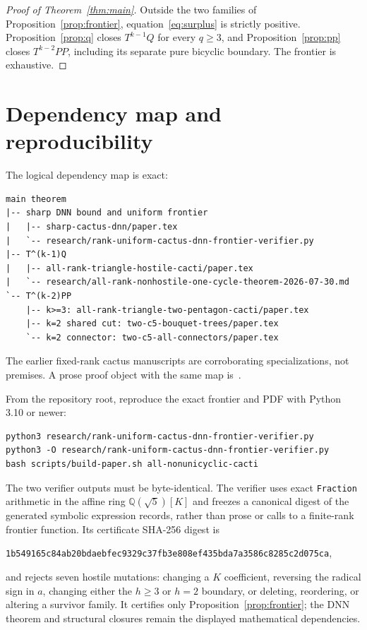 \documentclass[11pt]{article}
\begin{document}
\begin{proof}[Proof of Theorem~\ref{thm:main}]
Outside the two families of Proposition~\ref{prop:frontier},
equation~\eqref{eq:surplus} is strictly positive.  Proposition~\ref{prop:q}
closes $T^{k-1}Q$ for every $q\geq3$, and Proposition~\ref{prop:pp} closes
$T^{k-2}PP$, including its separate pure bicyclic boundary.  The frontier is
exhaustive.
\end{proof}

\section{Dependency map and reproducibility}

The logical dependency map is exact:
\begin{verbatim}
main theorem
|-- sharp DNN bound and uniform frontier
|   |-- sharp-cactus-dnn/paper.tex
|   `-- research/rank-uniform-cactus-dnn-frontier-verifier.py
|-- T^(k-1)Q
|   |-- all-rank-triangle-hostile-cacti/paper.tex
|   `-- research/all-rank-nonhostile-one-cycle-theorem-2026-07-30.md
`-- T^(k-2)PP
    |-- k>=3: all-rank-triangle-two-pentagon-cacti/paper.tex
    |-- k=2 shared cut: two-c5-bouquet-trees/paper.tex
    `-- k=2 connector: two-c5-all-connectors/paper.tex
\end{verbatim}
The earlier fixed-rank cactus manuscripts are corroborating specializations,
not premises.  A prose proof object with the same map is~\cite{ProofNote}.

From the repository root, reproduce the exact frontier and PDF with Python
3.10 or newer:
\begin{verbatim}
python3 research/rank-uniform-cactus-dnn-frontier-verifier.py
python3 -O research/rank-uniform-cactus-dnn-frontier-verifier.py
bash scripts/build-paper.sh all-nonunicyclic-cacti
\end{verbatim}
The two verifier outputs must be byte-identical.  The verifier uses exact
\texttt{Fraction} arithmetic in the affine ring $\mathbb Q(\sqrt5)[K]$ and
freezes a canonical digest of the generated symbolic expression records,
rather than prose or calls to a finite-rank frontier function.  Its certificate
SHA-256 digest is
\begin{center}
\texttt{1b549165c84ab20bdaebfec9329c37fb3e808ef435bda7a3586c8285c2d075ca},
\end{center}
and rejects seven hostile mutations: changing a $K$ coefficient, reversing the
radical sign in $a$, changing either the $h\geq3$ or $h=2$ boundary, or
deleting, reordering, or altering a survivor family.  It certifies only
Proposition~\ref{prop:frontier}; the DNN theorem and structural closures remain
the displayed mathematical dependencies.
\end{document}

